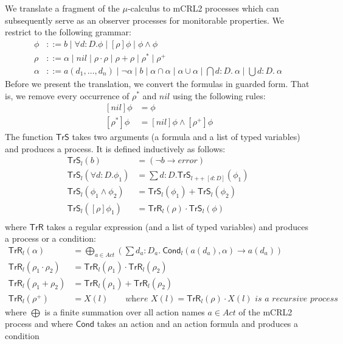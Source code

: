 \documentclass[letter]{llncs}
\newcommand{\Tr}{\ensuremath{\mathsf{TrS}}}
\newcommand{\TrR}{\ensuremath{\mathsf{TrR}}}
\newcommand{\TrA}{\ensuremath{\mathsf{Cond}}}
\newcommand{\concat}{\ensuremath{\mathop{+\!\!+}}}
\begin{document}
We translate a fragment of the $\mu$-calculus to mCRL2 processes which
can subsequently serve as an observer processes for monitorable properties.
We restrict to the following grammar:
\[
\begin{array}{ll}
\phi & ::= b \mid \forall d{:}D.\phi \mid [\rho]\phi \mid \phi\wedge \phi\\
\rho & ::= \alpha \mid nil \mid \rho\cdot \rho \mid
              \rho+\rho \mid
              \rho^* \mid \rho^+ \\
\alpha & ::=  a(d_1,\dots,d_n) \mid \neg \alpha \mid b \mid
              \alpha \cap \alpha \mid \alpha \cup \alpha \mid
              \bigcap d{:}D.~\alpha \mid \bigcup d{:}D.~\alpha
\end{array}
\]
Before we present the translation, we convert the formulas in
guarded form. That is, we remove every occurrence of $\rho^*$ and $nil$ using
the following rules:
\[
\begin{array}{ll}
~
[nil]\phi &= \phi \\
~[\rho^*]\phi &= [nil]\phi \wedge [\rho^+]\phi
\end{array}
\]
The function $\Tr$ takes two arguments (a formula and a list of typed
variables) and produces a process. It is defined inductively as follows:
\[
\begin{array}{ll}
\Tr_l(b) &= (\neg b \to \textit{error}) \\
\Tr_l(\forall d:D.\phi_1) & = \sum d{:}D. \Tr_{l\concat [d:D]} (\phi_1) \\
\Tr_l(\phi_1 \wedge \phi_2) & = \Tr_l(\phi_1) + \Tr_l(\phi_2) \\
\Tr_l([\rho]\phi_1) & = \TrR_l(\rho) \cdot \Tr_l(\phi) \\
\end{array}
\]
where $\TrR$ takes a regular expression (and a list of typed variables)
and produces a process or a condition:
\[
\begin{array}{ll}
\TrR_l(\alpha) &= \bigoplus\limits_{a \in Act} (\sum d_a{:}D_a.~ \TrA_l(a(d_a),\alpha) \to a(d_a)) \\
\TrR_l(\rho_1 \cdot \rho_2) & = \TrR_l(\rho_1) \cdot \TrR_l(\rho_2) \\
\TrR_l(\rho_1 + \rho_2) &= \TrR_l(\rho_1) + \TrR_l(\rho_2) \\
\TrR_l(\rho^+) & = X(l) \qquad \textit{where $X(l) = \TrR_l(\rho)\cdot X(l)$ is
a recursive process} 
\end{array}
\]
where $\bigoplus$ is a finite summation over all action names
$a \in Act$ of the mCRL2 process and
where $\TrA$ takes an action and an action formula and produces a condition
\end{document}
